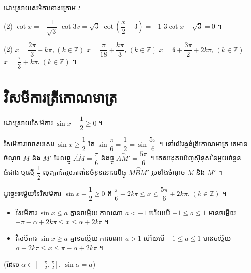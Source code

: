 \begin{pro}
ដោះស្រាយសមីការខាងក្រោម ៖
\begin{tasks}(2)
  \task $\cot x = -\dfrac{1}{\sqrt{3}}$
  \task $\cot 3x = \sqrt{3}$
  \task $\cot\left(\dfrac{x}{2} - 3\right) = -1$
  \task $3\cot x - \sqrt{3} = 0$ ។
\end{tasks}
\ans
\begin{tasks}(2)
  \task $x = \dfrac{2\pi}{3} + k\pi$, $(k \in \mathbb{Z})$
  \task $x = \dfrac{\pi}{18} + \dfrac{k\pi}{3}$, $(k \in \mathbb{Z})$
  \task $x = 6 + \dfrac{3\pi}{2} + 2k\pi$, $(k \in \mathbb{Z})$
  \task $x = \dfrac{\pi}{3} + k\pi$, $(k \in \mathbb{Z})$ ។
\end{tasks}
\end{pro}

\section{វិសមីការត្រីកោណមាត្រ}

\begin{example}[ឧទាហរណ៍ ១]
ដោះស្រាយវិសមីការ $\sin x - \dfrac{1}{2} \ge 0$ ។

វិសមីការអាចសរសេរ $\sin x \ge \dfrac{1}{2}$ តែ $\sin\dfrac{\pi}{6} = \dfrac{1}{2} = \sin\dfrac{5\pi}{6}$ ។ នៅលើរង្វង់ត្រីកោណមាត្រ គេមានចំណុច $M$ និង $M'$ ដែលធ្នូ $\overset{\frown}{AM} = \dfrac{\pi}{6}$ និងធ្នូ $\overset{\frown}{AM'} = \dfrac{5\pi}{6}$ ។ គេសង្កេតឃើញស៊ីនុសនៃមួយចំនួនធំជាង ឬស្មើ $\dfrac{1}{2}$ លុះត្រាតែរូបភាពនៃចំនួននោះលើធ្នូ $\overset{\frown}{MBM'}$ រួមទាំងចំណុច $M$ និង $M'$ ។
\begin{center}
\end{center}
ដូច្នេះចម្លើយនៃវិសមីការ $\sin x - \dfrac{1}{2} \ge 0$ គឺ $\dfrac{\pi}{6} + 2k\pi \le x \le \dfrac{5\pi}{6} + 2k\pi$, $(k \in \mathbb{Z})$ ។
\end{example}

\begin{formulaBox}[ជាទូទៅ]
\begin{itemize}
  \item វិសមីការ $\sin x \le a$ គ្មានចម្លើយ កាលណា $a < -1$ ហើយបើ $-1 \le a \le 1$ មានចម្លើយ $-\pi - \alpha + 2k\pi \le x \le \alpha + 2k\pi$ ។
  \item វិសមីការ $\sin x \ge a$ គ្មានចម្លើយ កាលណា $a > 1$ ហើយបើ $-1 \le a \le 1$ មានចម្លើយ $\alpha + 2k\pi \le x \le \pi - \alpha + 2k\pi$ ។
\end{itemize}
(ដែល $\alpha \in \left[-\frac{\pi}{2}, \frac{\pi}{2}\right]$, $\sin\alpha = a$)
\end{formulaBox}

